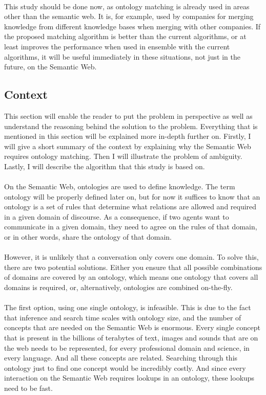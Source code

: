 \documentclass{article}
\begin{document}
 \paragraph{}
 This study should be done now, as ontology matching is already used in areas other than the semantic web. It is, for example, used by companies for merging knowledge from different knowledge bases when merging with other companies. If the proposed matching algorithm is better than the current algorithms, or at least improves the performance when used in ensemble with the current algorithms, it will be useful immediately in these situations, not just in the future, on the Semantic Web.

 \subsection{Context}
 This section will enable the reader to put the problem in perspective as well as understand the reasoning behind the solution to the problem. Everything that is mentioned in this section will be explained more in-depth further on.
 Firstly, I will give a short summary of the context by explaining why the Semantic Web requires ontology matching. Then I will illustrate the problem of ambiguity. Lastly, I will describe the algorithm that this study is based on.
 \paragraph{}
 On the Semantic Web, ontologies are used to define knowledge\cite{fensel2001ontologies}.
 The term ontology will be properly defined later on, but for now it suffices to know that an ontology is a set of rules that determine what relations are allowed and required in a given domain of discourse. As a consequence, if two agents want to communicate in a given domain, they need to agree on the rules of that domain, or in other words, share the ontology of that domain.
 \paragraph{}
 However, it is unlikely that a conversation only covers one domain. To solve this, there are two potential solutions. Either you ensure that all possible combinations of domains are covered by an ontology, which means one ontology that covers all domains is required, or, alternatively, ontologies are combined on-the-fly.
 \paragraph{}
 The first option, using one single ontology, is infeasible. This is due to the fact that inference and search time scales with ontology size\cite{complexity},
 and the number of concepts that are needed on the Semantic Web is enormous. Every single concept that is present in the billions of terabytes of text, images and sounds that are on the web needs to be represented, for every professional domain and science, in every language. And all these concepts are related. Searching through this ontology just to find one concept would be incredibly costly. And since every interaction on the Semantic Web requires lookups in an ontology, these lookups need to be fast.
\end{document}
